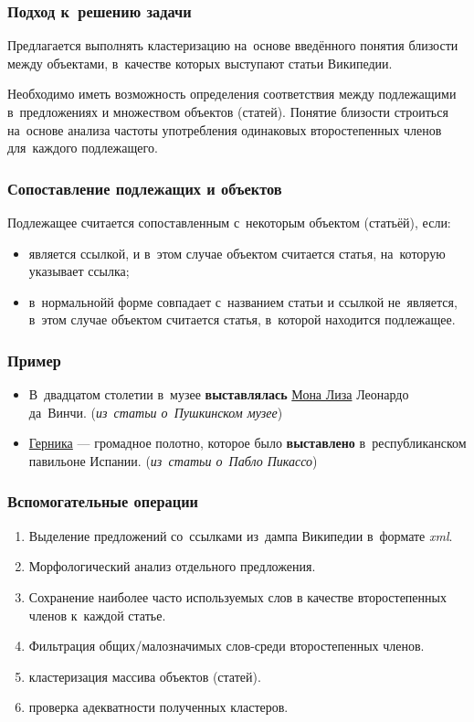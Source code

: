 \documentclass{beamer}
\begin{document}
\begin{frame}
\frametitle{Подход к~решению задачи}
Предлагается выполнять кластеризацию на~основе введённого понятия близости между объектами,
в~качестве которых выступают статьи Википедии.

\vspace{1cm} 

Необходимо иметь возможность определения соответствия между подлежащими в~предложениях
и множеством объектов (статей).
Понятие близости строиться на~основе анализа частоты употребления одинаковых второстепенных членов для~каждого подлежащего.
\end{frame}

\begin{frame}
\frametitle{Сопоставление подлежащих и объектов}

Подлежащее считается сопоставленным с~некоторым объектом (статьёй), если:

\begin{itemize}
\item {
является ссылкой,
и в~этом случае объектом считается статья, на~которую указывает ссылка;
}
\item {
в~нормальнойй форме совпадает с~названием статьи и ссылкой не~является,
в~этом случае объектом считается статья, в~которой находится подлежащее.
}
\end{itemize}
\end{frame}

\begin{frame}
\frametitle{Пример}
\begin{itemize}
\item {
В~двадцатом столетии в~музее {\bf выставлялась} \underline{Мона Лиза} Леонардо да~Винчи. 
({\it из~статьи о~Пушкинском музее})
}

\item {
\underline{Герника} --- громадное полотно, которое было {\bf выставлено} в~республиканском павильоне Испании. 
({\it из~статьи о~Пабло Пикассо})
}
\end{itemize}
\end{frame}

\begin{frame}
\frametitle{Вспомогательные операции}
\begin{enumerate}
\item {
Выделение предложений со~ссылками из~дампа Википедии в~формате {\it xml}.
}
\item {
Морфологический анализ отдельного предложения.
}
\item {
Сохранение наиболее часто используемых слов в качестве второстепенных членов к~каждой статье.
}
\item {
Фильтрация общих/малозначимых слов-среди второстепенных членов.
}
\item {
кластеризация массива объектов (статей).
}
\item {
проверка адекватности полученных кластеров.
}
\end{enumerate}
\end{frame}
\end{document}
